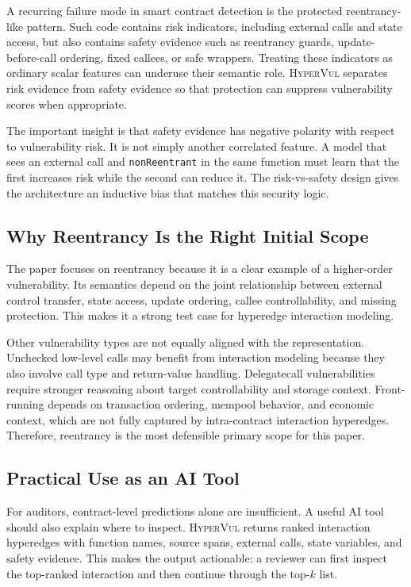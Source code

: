 \documentclass[conference]{IEEEtran}
\newcommand{\tool}{\textsc{HyperVul}}
\begin{document}
A recurring failure mode in smart contract detection is the protected reentrancy-like pattern. Such code contains risk indicators, including external calls and state access, but also contains safety evidence such as reentrancy guards, update-before-call ordering, fixed callees, or safe wrappers. Treating these indicators as ordinary scalar features can underuse their semantic role. \tool{} separates risk evidence from safety evidence so that protection can suppress vulnerability scores when appropriate.

The important insight is that safety evidence has negative polarity with respect to vulnerability risk. It is not simply another correlated feature. A model that sees an external call and \texttt{nonReentrant} in the same function must learn that the first increases risk while the second can reduce it. The risk-vs-safety design gives the architecture an inductive bias that matches this security logic.

\subsection{Why Reentrancy Is the Right Initial Scope}

The paper focuses on reentrancy because it is a clear example of a higher-order vulnerability. Its semantics depend on the joint relationship between external control transfer, state access, update ordering, callee controllability, and missing protection. This makes it a strong test case for hyperedge interaction modeling.

Other vulnerability types are not equally aligned with the representation. Unchecked low-level calls may benefit from interaction modeling because they also involve call type and return-value handling. Delegatecall vulnerabilities require stronger reasoning about target controllability and storage context. Front-running depends on transaction ordering, mempool behavior, and economic context, which are not fully captured by intra-contract interaction hyperedges. Therefore, reentrancy is the most defensible primary scope for this paper.

\subsection{Practical Use as an AI Tool}

For auditors, contract-level predictions alone are insufficient. A useful AI tool should also explain where to inspect. \tool{} returns ranked interaction hyperedges with function names, source spans, external calls, state variables, and safety evidence. This makes the output actionable: a reviewer can first inspect the top-ranked interaction and then continue through the top-$k$ list.
\end{document}

